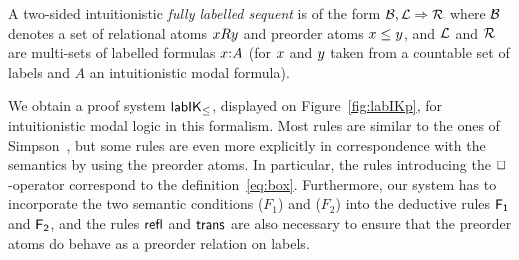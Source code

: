 \documentclass[twoside]{aiml20}
\begin{document}
\begin{definition}
	A two-sided intuitionistic \emph{fully labelled sequent} is of the form $\mathcal{B}, \mathcal{L} \Rightarrow \mathcal{R}$ where $\mathcal{B}$ denotes a set of relational atoms $xRy$ and preorder atoms $x\le{y}$, and $\mathcal{L}$ and $\mathcal{R}$ are multi-sets of labelled formulas $x\mathord{:}A$ (for $x$ and $y$ taken from a countable set of labels and $A$ an intuitionistic modal formula).
\end{definition}






%
We obtain a proof system $\mathsf{lab}\mathsf{IK}_{\le}$, displayed on Figure~\ref{fig:labIKp}, for intuitionistic modal logic in this formalism. 
%
Most rules are similar to the ones of Simpson~\cite{simpson1994}, but some rules are even more explicitly in correspondence with the semantics by using the preorder atoms. 
%
In particular, the rules introducing the $\mathord{\Box}$-operator correspond to the definition~\eqref{eq:box}.
%
Furthermore, our system has to incorporate the two semantic conditions ($F_1$) and ($F_2$) into the deductive rules $\mathsf{F_1}$ and $\mathsf{F_2}$, and the rules $\mathsf{refl}$ and $\mathsf{trans}$ are also necessary to ensure that the preorder atoms do behave as a preorder relation on labels.
%

%
%

\end{document}
